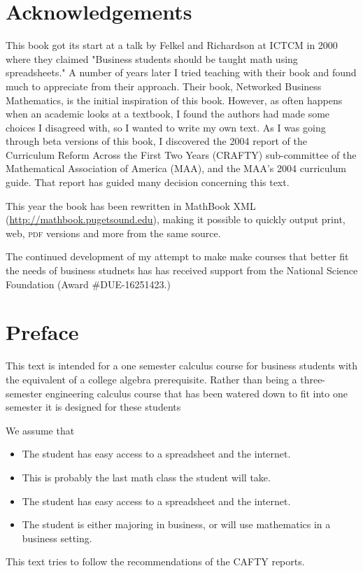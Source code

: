 \documentclass[10pt,]{book}
\newcommand{\acronym}[1]{\textsc{\MakeLowercase{#1}}}
\theoremstyle{plain}
\theoremstyle{definition}
\theoremstyle{definition}
\begin{document}
\chapter*{Acknowledgements}\label{acknowledgement-1}
This book got its start at a talk by Felkel and Richardson  at ICTCM in 2000 where they claimed "Business students should be taught math using spreadsheets."  A number of years later I tried teaching with their book and found much to appreciate from their approach.  Their book, Networked Business Mathematics, is the initial inspiration of this book.  However, as often happens when an academic looks at a textbook, I found the authors had made some choices I disagreed with, so I wanted to write my own text.  As I was going through beta versions of this book, I  discovered the 2004 report of the Curriculum Reform Across the First Two Years (CRAFTY) sub-committee of the Mathematical Association of America (MAA), and the MAA's 2004 curriculum guide.  That report has guided many decision concerning this text.
%
\par
  This year the book has been rewritten in MathBook XML (\href{http://mathbook.pugetsound.edu}{http://mathbook.pugetsound.edu}), making it possible to quickly output print, web, \acronym{PDF} versions and more from the same source.%
\par
  The continued development of my attempt to make make courses that better fit the needs of business studnets has  has received support from the National Science Foundation (Award \#DUE-16251423.)%
\chapter*{Preface}\label{preface-1}
This text is intended for a one semester calculus course for business students with the equivalent of a college algebra prerequisite.  Rather than being a three-semester engineering calculus course that has been watered down to fit into one semester it is designed for these students%
\par
 We assume that %
\leavevmode%
\begin{itemize}[label=\textbullet]
\item{}The student has easy access to a spreadsheet and the internet.%
\item{}This is probably the last math class the student will take.%
\item{}The student has easy access to a spreadsheet and the internet.%
\item{}The student is either majoring in business, or will use mathematics in a business setting.%
\end{itemize}
\par
This text tries to follow the recommendations of the CAFTY reports.%
\par
\end{document}
